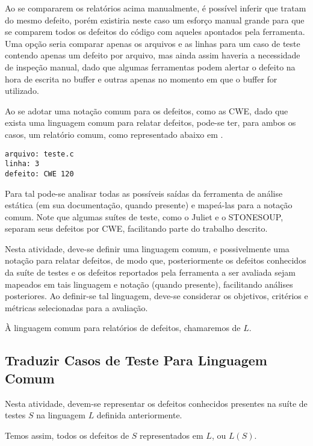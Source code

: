 Ao se compararem os relatórios acima manualmente, é possível inferir que tratam do mesmo defeito, porém existiria neste caso um esforço manual grande para que se comparem todos os defeitos do código com aqueles apontados pela ferramenta. Uma opção seria comparar apenas os arquivos e as linhas para um caso de teste contendo apenas um defeito por arquivo, mas ainda assim haveria a necessidade de inspeção manual, dado que algumas ferramentas podem alertar o defeito na hora de escrita no buffer e outras apenas no momento em que o buffer for utilizado.

Ao se adotar uma notação comum para os defeitos, como as CWE, dado que exista uma linguagem comum para relatar defeitos, pode-se ter, para ambos os casos, um relatório comum, como representado abaixo em .
\begin{lstlisting}[caption=Relatório comum, label=relatorio_comum]
arquivo: teste.c
linha: 3
defeito: CWE 120
\end{lstlisting}
Para tal pode-se analisar todas as possíveis saídas da ferramenta de análise estática (em sua documentação, quando presente) e mapeá-las para a notação comum. Note que algumas suítes de teste, como o Juliet e o STONESOUP, separam seus defeitos por CWE, facilitando parte do trabalho descrito.

Nesta atividade, deve-se definir uma linguagem comum, e possivelmente uma notação para relatar defeitos, de modo que, posteriormente os defeitos conhecidos da suíte de testes e os defeitos reportados pela ferramenta a ser avaliada sejam mapeados em tais linguagem e notação (quando presente), facilitando análises posteriores. Ao definir-se tal linguagem, deve-se considerar os objetivos, critérios e métricas selecionadas para a avaliação.

À linguagem comum para relatórios de defeitos, chamaremos de $L$.

\subsection{Traduzir Casos de Teste Para Linguagem Comum}

Nesta atividade, devem-se representar os defeitos conhecidos presentes na suíte de testes $S$ na linguagem $L$ definida anteriormente.

Temos assim, todos os defeitos de $S$ representados em $L$, ou $L(S)$.

